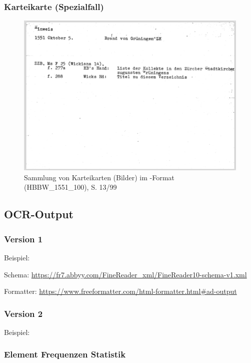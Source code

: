 \subsubsection{Karteikarte (Spezialfall)}
\begin{figure}[H]
\centering
\includegraphics[scale=0.42]{Bilder/Exception.png}
\caption{Sammlung von Karteikarten (Bilder) im -Format (HBBW\_1551\_100), S. 13/99}
\end{figure}




\subsection{OCR-Output}

\subsubsection{Version 1}

\noindent
Beispiel: 

\noindent
Schema: \url{https://fr7.abbyy.com/FineReader_xml/FineReader10-schema-v1.xml}

\noindent
Formatter: \url{https://www.freeformatter.com/html-formatter.html#ad-output}

\lstset{language=myXML}



\subsubsection{Version 2}

\noindent
Beispiel: 





\subsubsection{Element Frequenzen Statistik}
\label{tabelle:ocr_statistik}

{\small }









